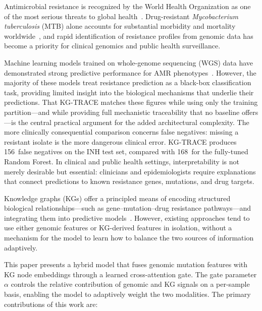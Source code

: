 \documentclass[conference]{IEEEtran}
\begin{document}
Antimicrobial resistance is recognized by the World Health Organization as one of the most serious threats to global health~\cite{ref_who_amr}. Drug-resistant \textit{Mycobacterium tuberculosis} (MTB) alone accounts for substantial morbidity and mortality worldwide~\cite{ref_tb_burden}, and rapid identification of resistance profiles from genomic data has become a priority for clinical genomics and public health surveillance.

Machine learning models trained on whole-genome sequencing (WGS) data have demonstrated strong predictive performance for AMR phenotypes~\cite{ref_ml_amr_review}. However, the majority of these models treat resistance prediction as a black-box classification task, providing limited insight into the biological mechanisms that underlie their predictions. That KG-TRACE matches these figures while using only the training partition---and while providing full mechanistic traceability that no baseline offers---is the central practical argument for the added architectural complexity. The more clinically consequential comparison concerns false negatives: missing a resistant isolate is the more dangerous clinical error. KG-TRACE produces 156~false negatives on the INH test set, compared with 168~for the fully-tuned Random Forest. In clinical and public health settings, interpretability is not merely desirable but essential: clinicians and epidemiologists require explanations that connect predictions to known resistance genes, mutations, and drug targets.

Knowledge graphs (KGs) offer a principled means of encoding structured biological relationships---such as gene--mutation--drug resistance pathways---and integrating them into predictive models~\cite{ref_kg_biomed}. However, existing approaches tend to use either genomic features or KG-derived features in isolation, without a mechanism for the model to learn how to balance the two sources of information adaptively.

This paper presents a hybrid model that fuses genomic mutation features with KG node embeddings through a learned cross-attention gate. The gate parameter $\alpha$ controls the relative contribution of genomic and KG signals on a per-sample basis, enabling the model to adaptively weight the two modalities. The primary contributions of this work are:
\end{document}
